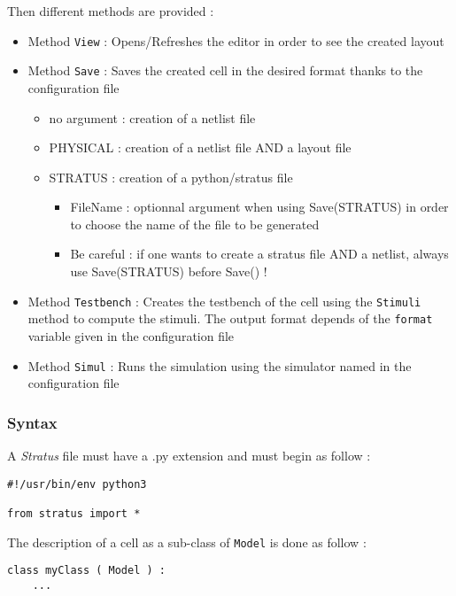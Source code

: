 \indent Then different methods are provided :
\begin{itemize}
    \item Method \verb-View- : Opens/Refreshes the editor in order to see the created layout
    \item Method \verb-Save- : Saves the created cell in the desired format thanks to the configuration file
    \begin{itemize}
        \item no argument : creation of a netlist file %
        \item PHYSICAL : creation of a netlist file AND a layout file %
        \item STRATUS : creation of a python/stratus file
        \begin{itemize}
            \item FileName : optionnal argument when using Save(STRATUS) in order to choose the name of the file to be generated
            \item Be careful : if one wants to create a stratus file AND a netlist, always use Save(STRATUS) before Save() !
        \end{itemize}
    \end{itemize}
    \item Method \verb-Testbench- : Creates the testbench of the cell using the \verb-Stimuli- method to compute the stimuli. The output format depends of the \verb-format- variable given in the configuration file
    \item Method \verb-Simul- : Runs the simulation using the simulator named in the configuration file
\end{itemize}

\subsubsection{Syntax}

A \emph{Stratus} file must have a .py extension and must begin as follow :
\begin{verbatim}
#!/usr/bin/env python3

from stratus import *
\end{verbatim}

\indent The description of a cell as a sub-class of \verb-Model- is done as follow :
\begin{verbatim}
class myClass ( Model ) :
    ...
\end{verbatim}
    
